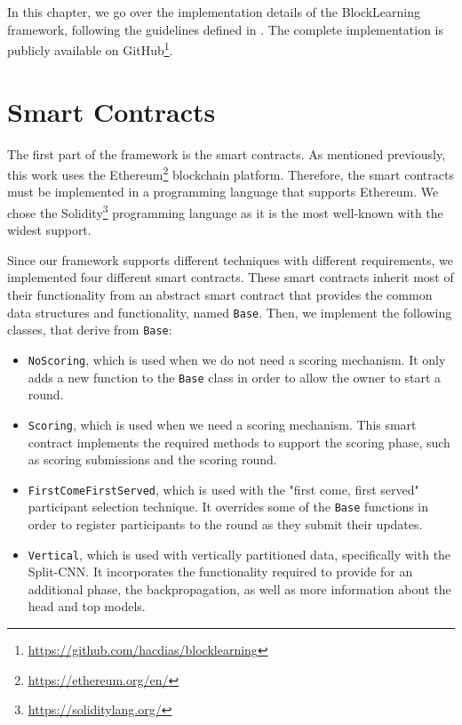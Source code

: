 In this chapter, we go over the implementation details of the BlockLearning framework, following the guidelines defined in . The complete implementation is publicly available on GitHub\footnote{\url{https://github.com/hacdias/blocklearning}}.

\section{Smart Contracts}

The first part of the framework is the smart contracts. As mentioned previously, this work uses the Ethereum\footnote{\url{https://ethereum.org/en/}} blockchain platform. Therefore, the smart contracts must be implemented in a programming language that supports Ethereum. We chose the Solidity\footnote{\url{https://soliditylang.org/}} programming language as it is the most well-known with the widest support.

Since our framework supports different techniques with different requirements, we implemented four different smart contracts. These smart contracts inherit most of their functionality from an abstract smart contract that provides the common data structures and functionality, named \texttt{Base}. Then, we implement the following classes, that derive from \texttt{Base}:

\begin{itemize}
    \item \texttt{NoScoring}, which is used when we do not need a scoring mechanism. It only adds a new function to the \texttt{Base} class in order to allow the owner to start a round.
    
    \item \texttt{Scoring}, which is used when we need a scoring mechanism. This smart contract implements the required methods to support the scoring phase, such as scoring submissions and the scoring round.
    
    \item \texttt{FirstComeFirstServed}, which is used with the "first come, first served" participant selection technique. It overrides some of the \texttt{Base} functions in order to register participants to the round as they submit their updates.
    
    \item \texttt{Vertical}, which is used with vertically partitioned data, specifically with the Split-CNN. It incorporates the functionality required to provide for an additional phase, the backpropagation, as well as more information about the head and top models.
\end{itemize}

